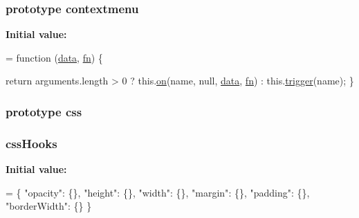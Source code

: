 \subsubsection[{\texorpdfstring{contextmenu}{contextmenu}}]{ {\bf prototype} contextmenu}\hypertarget{jquery-2_82_81-vsdoc_8js_afb948baf7821b3f288133d6f9b8da16d}{}\label{jquery-2_82_81-vsdoc_8js_afb948baf7821b3f288133d6f9b8da16d}
{\bfseries Initial value\+:}
\begin{DoxyCode}
= \textcolor{keyword}{function} (\hyperlink{jquery-2_82_81-vsdoc_8js_a609407b3456fdc3c5671a9fc4a226ff7}{data}, \hyperlink{jquery-2_82_81-vsdoc_8js_acef6bdaf6b9b20fdcca1ea86f0902c3b}{fn}) \{

        \textcolor{keywordflow}{return} arguments.length > 0 ?
            this.\hyperlink{jquery-2_82_81-vsdoc_8js_ae453b412b883f60220d73468ef6c6dbc}{on}(name, null, \hyperlink{jquery-2_82_81-vsdoc_8js_a609407b3456fdc3c5671a9fc4a226ff7}{data}, \hyperlink{jquery-2_82_81-vsdoc_8js_acef6bdaf6b9b20fdcca1ea86f0902c3b}{fn}) :
            this.\hyperlink{jquery-2_82_81-vsdoc_8js_a2388c4114d5e3e4eab020f973641519c}{trigger}(name);
    \}
\end{DoxyCode}
\subsubsection[{\texorpdfstring{css}{css}}]{ {\bf prototype} css}\hypertarget{jquery-2_82_81-vsdoc_8js_aa8c6af259210b33d20642f8ee70cbfa4}{}\label{jquery-2_82_81-vsdoc_8js_aa8c6af259210b33d20642f8ee70cbfa4}
\subsubsection[{\texorpdfstring{css\+Hooks}{cssHooks}}]{ css\+Hooks}\hypertarget{jquery-2_82_81-vsdoc_8js_a9966a63bdc4e33753dbe36a83e7f96bf}{}\label{jquery-2_82_81-vsdoc_8js_a9966a63bdc4e33753dbe36a83e7f96bf}
{\bfseries Initial value\+:}
\begin{DoxyCode}
= \{
        \textcolor{stringliteral}{"opacity"}: \{\},
        \textcolor{stringliteral}{"height"}: \{\},
        \textcolor{stringliteral}{"width"}: \{\},
        \textcolor{stringliteral}{"margin"}: \{\},
        \textcolor{stringliteral}{"padding"}: \{\},
        \textcolor{stringliteral}{"borderWidth"}: \{\}
    \}
\end{DoxyCode}
